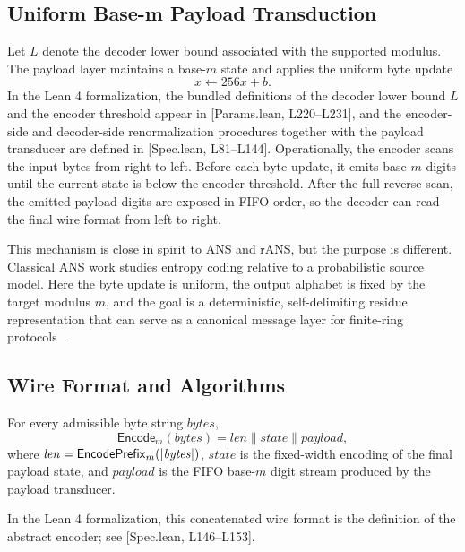 \documentclass{system-security-article}
\providecommand{\href}[2]{#2}
\newcommand{\EncodeM}{\mathsf{Encode}_m}
\newcommand{\EncodePrefixM}{\mathsf{EncodePrefix}_m}
\newcommand{\concat}{\mathbin{\|}}
\newcommand{\BaseM}{base-\(m\)}
\newcommand{\BytesVar}{\mathit{bytes}}
\newcommand{\LeanParams}[2]{\href{https://github.com/KyrylR/phd-symmetric-cryptography/blob/8e903222a7df1c4365592e4b16fa752a924b8977/lean/encoding-dr-1/EncodingProofs/BaseMLen/Params.lean\#L#1-L#2}{[Params.lean, L#1--L#2]}}
\newcommand{\LeanSpec}[2]{\href{https://github.com/KyrylR/phd-symmetric-cryptography/blob/8e903222a7df1c4365592e4b16fa752a924b8977/lean/encoding-dr-1/EncodingProofs/BaseMLen/Spec.lean\#L#1-L#2}{[Spec.lean, L#1--L#2]}}
\begin{document}
    \subsection{Uniform Base-m Payload Transduction}
    \label{subsec:payload}

    Let \(L\) denote the decoder lower bound associated with the supported modulus.
    The payload layer maintains a \BaseM{} state and applies the uniform byte update
    \[
        x \leftarrow 256x + b.
    \]
    In the Lean 4 formalization, the bundled definitions of the decoder lower bound \(L\) and the encoder
    threshold appear in \LeanParams{220}{231}, and the encoder-side and decoder-side renormalization procedures
    together with the payload transducer are defined in \LeanSpec{81}{144}.
    Operationally, the encoder scans the input bytes from right to left.
    Before each byte update, it emits \BaseM{} digits until the current state is below the encoder threshold.
    After the full reverse scan, the emitted payload digits are exposed in FIFO order,
    so the decoder can read the final wire format from left to right.

    This mechanism is close in spirit to ANS and rANS, but the purpose is different.
    Classical ANS work studies entropy coding relative to a probabilistic source model.
    Here the byte update is uniform, the output alphabet is fixed by the target modulus \(m\),
    and the goal is a deterministic, self-delimiting residue representation that can serve as a
    canonical message layer for finite-ring protocols~\cite{duda2013ans,giesen2014rans}.

    \subsection{Wire Format and Algorithms}
    \label{subsec:wire}

    \begin{definition}
        \label{def:wire-format}
        For every admissible byte string \(\BytesVar\),
        \[
            \EncodeM(\BytesVar) = \mathit{len} \concat \mathit{state} \concat \mathit{payload},
        \]
        where \(\mathit{len} = \EncodePrefixM(\abs{\BytesVar})\), \(\mathit{state}\) is the fixed-width encoding of
        the final payload state, and \(\mathit{payload}\) is the FIFO \BaseM{} digit stream produced by the payload transducer.
    \end{definition}
    In the Lean 4 formalization, this concatenated wire format is the definition of the abstract encoder; see \LeanSpec{146}{153}.
\end{document}

